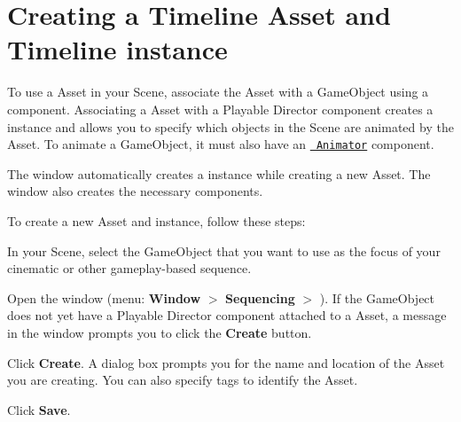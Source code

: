 \chapter{Creating a Timeline Asset and Timeline instance}
\hypertarget{md__hey_tea_9_2_library_2_package_cache_2com_8unity_8timeline_0d1_87_85_2_documentation_0i_2wf__instance}{}\label{md__hey_tea_9_2_library_2_package_cache_2com_8unity_8timeline_0d1_87_85_2_documentation_0i_2wf__instance}
\label{md__hey_tea_9_2_library_2_package_cache_2com_8unity_8timeline_0d1_87_85_2_documentation_0i_2wf__instance_autotoc_md4771}%
%
 To use a  Asset in your Scene, associate the  Asset with a Game\+Object using a  component. Associating a  Asset with a Playable Director component creates a  instance and allows you to specify which objects in the Scene are animated by the  Asset. To animate a Game\+Object, it must also have an \href{https://docs.unity3d.com/Manual/class-Animator.html}{\texttt{ Animator}} component.

The  window automatically creates a  instance while creating a new  Asset. The  window also creates the necessary components.

To create a new  Asset and  instance, follow these steps\+:


\begin{DoxyEnumerate}
\item In your Scene, select the Game\+Object that you want to use as the focus of your cinematic or other gameplay-\/based sequence.
\item Open the  window (menu\+: {\bfseries{Window}} \texorpdfstring{$>$}{>} {\bfseries{Sequencing}} \texorpdfstring{$>$}{>} {\bfseries{}}). If the Game\+Object does not yet have a Playable Director component attached to a  Asset, a message in the  window prompts you to click the {\bfseries{Create}} button.
\item Click {\bfseries{Create}}. A dialog box prompts you for the name and location of the  Asset you are creating. You can also specify tags to identify the  Asset.
\item Click {\bfseries{Save}}.
\end{DoxyEnumerate}



